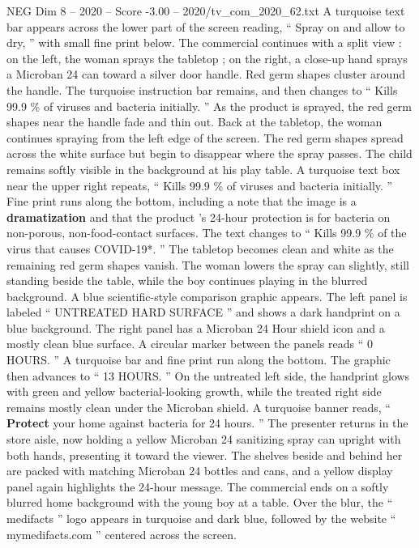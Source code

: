 \begin{textsample}{NEG Dim 8 – 2020 – Score -3.00 – 2020/tv\_com\_2020\_62.txt}
A turquoise text bar appears across the lower part of the screen reading, “ Spray on and allow to dry, ” with small fine print below.
The commercial continues with a split view : on the left, the woman sprays the tabletop ; on the right, a close-up hand sprays a Microban 24 can toward a silver door handle.
Red germ shapes cluster around the handle.
The turquoise instruction bar remains, and then changes to “ Kills 99.9 \% of viruses and bacteria initially. ” As the product is sprayed, the red germ shapes near the handle fade and thin out.
Back at the tabletop, the woman continues spraying from the left edge of the screen.
The red germ shapes spread across the white surface but begin to disappear where the spray passes.
The child remains softly visible in the background at his play table.
A turquoise text box near the upper right repeats, “ Kills 99.9 \% of viruses and bacteria initially. ” Fine print runs along the bottom, including a note that the image is a \textbf{dramatization} and that the product ’s 24-hour protection is for bacteria on non-porous, non-food-contact surfaces.
The text changes to “ Kills 99.9 \% of the virus that causes COVID-19*. ” The tabletop becomes clean and white as the remaining red germ shapes vanish.
The woman lowers the spray can slightly, still standing beside the table, while the boy continues playing in the blurred background.
A blue scientific-style comparison graphic appears.
The left panel is labeled “ UNTREATED HARD SURFACE ” and shows a dark handprint on a blue background.
The right panel has a Microban 24 Hour shield icon and a mostly clean blue surface.
A circular marker between the panels reads “ 0 HOURS. ” A turquoise bar and fine print run along the bottom.
The graphic then advances to “ 13 HOURS. ” On the untreated left side, the handprint glows with green and yellow bacterial-looking growth, while the treated right side remains mostly clean under the Microban shield.
A turquoise banner reads, “ \textbf{Protect} your home against bacteria for 24 hours. ” The presenter returns in the store aisle, now holding a yellow Microban 24 sanitizing spray can upright with both hands, presenting it toward the viewer.
The shelves beside and behind her are packed with matching Microban 24 bottles and cans, and a yellow display panel again highlights the 24-hour message.
The commercial ends on a softly blurred home background with the young boy at a table.
Over the blur, the “ medifacts ” logo appears in turquoise and dark blue, followed by the website “ mymedifacts.com ” centered across the screen.

\end{textsample}
